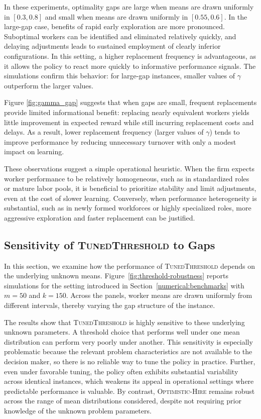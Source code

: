 \documentclass[opre,blindrev]{informs3}
\begin{document}
\begin{APPENDICES}
In these experiments, optimality gaps are large when means are drawn uniformly in \([0.3,0.8]\) and small when means are drawn uniformly in \([0.55, 0.6]\). In the large-gap case, benefits of rapid early exploration are more pronounced. Suboptimal workers can be identified and eliminated relatively quickly, and delaying adjustments leads to sustained employment of clearly inferior configurations. In this setting, a higher replacement frequency is advantageous, as it allows the policy to react more quickly to informative performance signals. The simulations confirm this behavior: for large-gap instances, smaller values of \(\gamma\) outperform the larger values.

Figure \ref{fig:gamma_gap} suggests that when gaps are small, frequent replacements provide limited informational benefit: replacing nearly equivalent workers yields little improvement in expected reward while still incurring replacement costs and delays. As a result, lower replacement frequency (larger values of \(\gamma\)) tends to improve performance by reducing unnecessary turnover with only a modest impact on learning.

These observations suggest a simple operational heuristic. When the firm expects worker performance to be relatively homogeneous, such as in standardized roles or mature labor pools, it is beneficial to prioritize stability and limit adjustments, even at the cost of slower learning. Conversely, when performance heterogeneity is substantial, such as in newly formed workforces or highly specialized roles, more aggressive exploration and faster replacement can be justified.

\subsection{Sensitivity of \textsc{TunedThreshold} to Gaps}
\label{sec:threshold-robustness}

In this section, we examine how the performance of \textsc{TunedThreshold} depends on the underlying unknown means. Figure~\ref{fig:threshold-robustness} reports simulations for the setting introduced in Section~\ref{numerical:benchmarks} with \(m=50\) and \(k=150\). Across the panels, worker means are drawn uniformly from different intervals, thereby varying the gap structure of the instance.

The results show that \textsc{TunedThreshold} is highly sensitive to these underlying unknown parameters. A threshold choice that performs well under one mean distribution can perform very poorly under another. This sensitivity is especially problematic because the relevant problem characteristics are not available to the decision maker, so there is no reliable way to tune the policy in practice. Further, even under favorable tuning, the policy often exhibits substantial variability across identical instances, which weakens its appeal in operational settings where predictable performance is valuable. By contrast, \textsc{Optimistic-Hire} remains robust across the range of mean distributions considered, despite not requiring prior knowledge of the unknown problem parameters.



\end{APPENDICES}
\end{document}
